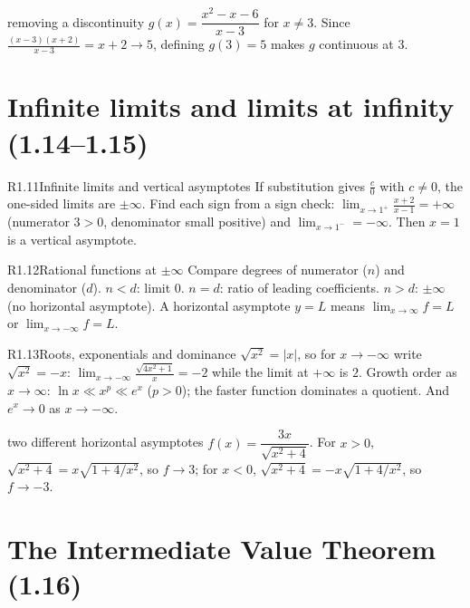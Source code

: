 \documentclass{apcalc}
\begin{document}
\begin{example}{removing a discontinuity}
$g(x)=\dfrac{x^2-x-6}{x-3}$ for $x\neq3$. Since $\frac{(x-3)(x+2)}{x-3}=x+2\to5$, defining $g(3)=5$ makes $g$ continuous at 3. 
\end{example}

\section{Infinite limits and limits at infinity (1.14--1.15)}

\begin{rulebox}{R1.11}{Infinite limits and vertical asymptotes}
If substitution gives $\frac{c}{0}$ with $c\ne0$, the one-sided limits are $\pm\infty$. Find each sign from a sign check: $\lim_{x\to1^+}\frac{x+2}{x-1}=+\infty$ (numerator $3>0$, denominator small positive) and $\lim_{x\to1^-}=-\infty$. Then $x=1$ is a vertical asymptote.
\end{rulebox}

\begin{rulebox}{R1.12}{Rational functions at $\pm\infty$}
Compare degrees of numerator ($n$) and denominator ($d$). $n<d$: limit 0. $n=d$: ratio of leading coefficients. $n>d$: $\pm\infty$ (no horizontal asymptote). A horizontal asymptote $y=L$ means $\lim_{x\to\infty}f=L$ or $\lim_{x\to-\infty}f=L$.
\end{rulebox}

\begin{rulebox}{R1.13}{Roots, exponentials and dominance}
$\sqrt{x^2}=|x|$, so for $x\to-\infty$ write $\sqrt{x^2}=-x$: $\displaystyle\lim_{x\to-\infty}\frac{\sqrt{4x^2+1}}{x}=-2$ while the limit at $+\infty$ is $2$. Growth order as $x\to\infty$: $\ln x\ll x^p\ll e^x$ ($p>0$); the faster function dominates a quotient. And $e^{x}\to0$ as $x\to-\infty$.
\end{rulebox}

\begin{example}{two different horizontal asymptotes}
$f(x)=\dfrac{3x}{\sqrt{x^2+4}}$. For $x>0$, $\sqrt{x^2+4}=x\sqrt{1+4/x^2}$, so $f\to3$; for $x<0$, $\sqrt{x^2+4}=-x\sqrt{1+4/x^2}$, so $f\to-3$. 
\end{example}

\section{The Intermediate Value Theorem (1.16)}
\end{document}
